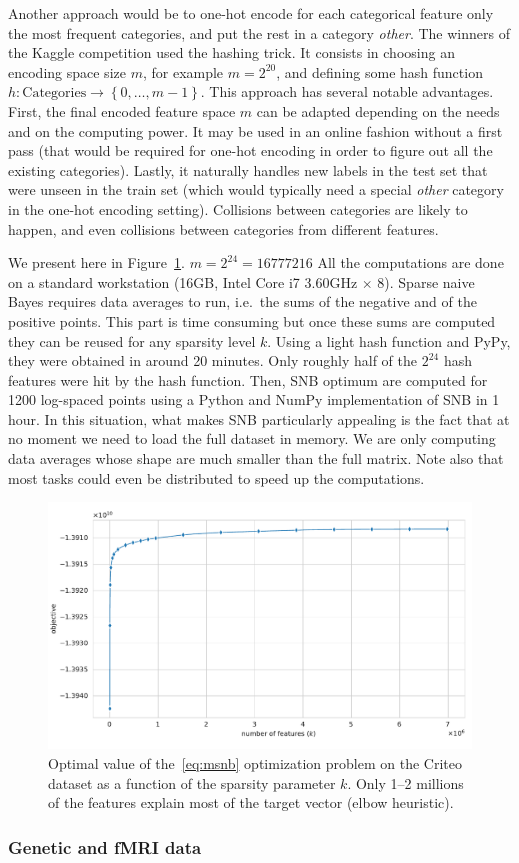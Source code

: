 Another approach would be to one-hot encode for each categorical feature only the most frequent categories,
and put the rest in a category \textit{other}.
The winners of the Kaggle competition used the hashing trick.
It consists in choosing an encoding space size $m$,
for example $m = 2^{20}$,
and defining some hash function $h \colon \text{Categories} \to \left\{ 0, \dots, m - 1 \right\}$.
This approach has several notable advantages.
First, the final encoded feature space $m$ can be adapted depending on the needs and on the computing power.
It may be used in an online fashion without a first pass
(that would be required for one-hot encoding in order to figure out all the existing categories).
Lastly, it naturally handles new labels in the test set that were unseen in the train set
(which would typically need a special \textit{other} category in the one-hot encoding setting).
Collisions between categories are likely to happen,
and even collisions between categories from different features.

We present here in Figure~\ref{fig:criteo_hash_elbow}.
$m = 2^{24} = 16777216$
All the computations are done on a standard workstation (16GB, Intel Core i7 3.60GHz $\times$ 8).
Sparse naive Bayes requires data averages to run,
i.e.\ the sums of the negative and of the positive points.
This part is time consuming but once these sums are computed they can be reused for any sparsity level $k$.
Using a light hash function and PyPy, they were obtained in around 20 minutes.
Only roughly half of the $2^{24}$ hash features were hit by the hash function.
Then, SNB optimum are computed for 1200 log-spaced points using a Python and NumPy implementation of SNB in 1 hour.
In this situation, what makes SNB particularly appealing is the fact that at no moment we need to load the full dataset
in memory.
We are only computing data averages whose shape are much smaller than the full matrix.
Note also that most tasks could even be distributed to speed up the computations.
\begin{figure}
    \centering
    \includegraphics[width=0.75\linewidth, height=0.4\linewidth]{figures/criteo_hash_elbow.pdf}
    \caption{
        Optimal value of the~\ref{eq:msnb} optimization problem on the Criteo dataset
        as a function of the sparsity parameter $k$.
        Only 1--2 millions of the features explain most of the target vector (elbow heuristic).
    }
    \label{fig:criteo_hash_elbow}
\end{figure}

\subsubsection{Genetic and fMRI data}\label{subsubsec:snb_genetic_fmri}
